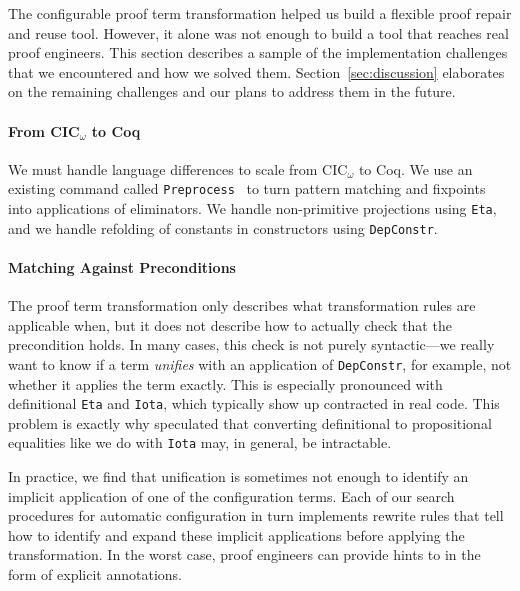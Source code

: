 The configurable proof term transformation helped us build a flexible proof repair and reuse tool.
However, it alone was not enough to build a tool that reaches real proof engineers.
This section describes a sample of the implementation challenges that we encountered and how we solved them.
Section~\ref{sec:discussion} elaborates on the remaining challenges and our plans to address them in the future.

\paragraph{From CIC$_{\omega}$ to Coq}

We must handle language differences to scale from CIC$_{\omega}$ to Coq.
We use an existing command called \lstinline{Preprocess}~\cite{Ringer2019} to turn pattern matching and fixpoints into 
applications of eliminators.
We handle non-primitive projections using \lstinline{Eta}, and we handle refolding of constants in constructors
using \lstinline{DepConstr}.

\paragraph{Matching Against Preconditions}

The proof term transformation only describes what transformation rules are applicable when,
but it does not describe how to actually check that the precondition holds.
In many cases, this check is not purely syntactic---we really want to know if a term \textit{unifies}
with an application of \lstinline{DepConstr}, for example, not whether it applies the term exactly.
This is especially pronounced with definitional \lstinline{Eta} and \lstinline{Iota},
which typically show up contracted in real code.
This problem is exactly why \citet{tabareau2019marriage} speculated that converting definitional to propositional equalities
like we do with \lstinline{Iota} may, in general, be intractable.

In practice, we find that unification is sometimes not enough to identify an implicit application of one of the configuration terms.
Each of our search procedures for automatic configuration in turn implements rewrite rules that tell \toolname
how to identify and expand these implicit applications before applying the transformation.
In the worst case, proof engineers can provide hints to \toolname in the form of explicit annotations.

